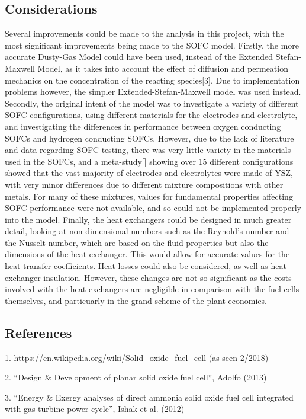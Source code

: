 \subsection{Considerations}
Several improvements could be made to the analysis in this project, with the most significant improvements being made to the SOFC model. Firstly, the more accurate Dusty-Gas Model could have been used, instead of the Extended Stefan-Maxwell Model, as it takes into account the effect of diffusion and permeation mechanics on the concentration of the reacting species[3]. Due to implementation problems however, the simpler Extended-Stefan-Maxwell model was used instead.
Secondly, the original intent of the model was to investigate a variety of different SOFC configurations, using different materials for the electrodes and electrolyte, and investigating the differences in performance between oxygen conducting SOFCs and hydrogen conducting SOFCs. However, due to the lack of literature and data regarding SOFC testing, there was very little variety in the materials used in the SOFCs, and a meta-study[] showing over 15 different configurations showed that the vast majority of electrodes and electrolytes were made of YSZ, with very minor differences due to different mixture compositions with other metals. For many of these mixtures, values for fundamental properties affecting SOFC performance were not available, and so could not be implemented properly into the model.
Finally, the heat exchangers could be designed in much greater detail, looking at non-dimensional numbers such as the Reynold’s number and the Nusselt number, which are based on the fluid properties but also the dimensions of the heat exchanger. This would allow for accurate values for the heat transfer coefficients. Heat losses could also be considered, as well as heat exchanger insulation. However, these changes are not so significant as the costs involved with the heat exchangers are negligible in comparison with the fuel cells themselves, and particuarly in the grand scheme of the plant economics.

\subsection{References}
1. https://en.wikipedia.org/wiki/Solid_oxide_fuel_cell (as seen 2/2018)

2. “Design & Development of planar solid oxide fuel cell”, Adolfo (2013)

3. “Energy & Exergy analyses of direct ammonia solid oxide fuel cell integrated with gas turbine power cycle”, Ishak et al. (2012)

